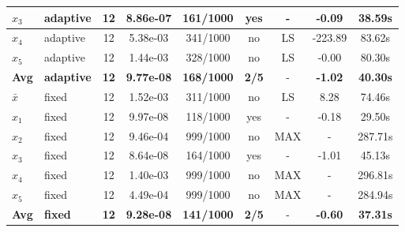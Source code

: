 \begin{longtable}{|l|l|c|c|c|c|c|c|c|}
\hline
$x_3$ & adaptive & 12 & 8.86e-07 & 161/1000 & yes & - & -0.09 & 38.59s \\
\hline
$x_4$ & adaptive & 12 & 5.38e-03 & 341/1000 & no & LS & -223.89 & 83.62s \\
\hline
$x_5$ & adaptive & 12 & 1.44e-03 & 328/1000 & no & LS & -0.00 & 80.30s \\
\hline
\hline\hline
\textbf{Avg} & \textbf{adaptive} & \textbf{12} & \textbf{9.77e-08} & \textbf{168/1000} & \textbf{2/5} & - & \textbf{-1.02} & \textbf{40.30s} \\
\hline\hline
\hline
$\bar{x}$ & fixed & 12 & 1.52e-03 & 311/1000 & no & LS & 8.28 & 74.46s \\
\hline
$x_1$ & fixed & 12 & 9.97e-08 & 118/1000 & yes & - & -0.18 & 29.50s \\
\hline
$x_2$ & fixed & 12 & 9.46e-04 & 999/1000 & no & MAX & - & 287.71s \\
\hline
$x_3$ & fixed & 12 & 8.64e-08 & 164/1000 & yes & - & -1.01 & 45.13s \\
\hline
$x_4$ & fixed & 12 & 1.40e-03 & 999/1000 & no & MAX & - & 296.81s \\
\hline
$x_5$ & fixed & 12 & 4.49e-04 & 999/1000 & no & MAX & - & 284.94s \\
\hline
\hline\hline
\textbf{Avg} & \textbf{fixed} & \textbf{12} & \textbf{9.28e-08} & \textbf{141/1000} & \textbf{2/5} & - & \textbf{-0.60} & \textbf{37.31s} \\
\hline\hline
\end{longtable}

